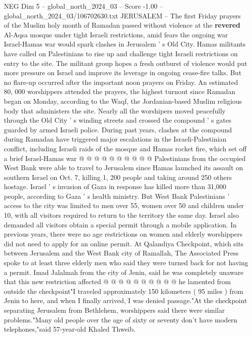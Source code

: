 \begin{textsample}{NEG Dim 5 – global\_north\_2024\_03 – Score -1.00 – global\_north\_2024\_03/106702630.txt}  \label{ex:f5_neg_166}
JERUSALEM -- The first Friday prayers of the Muslim holy month of Ramadan passed without violence at the \textbf{revered} Al-Aqsa mosque under tight Israeli restrictions, amid fears the ongoing war Israel-Hamas war would spark clashes in Jerusalem ' s Old City.
Hamas militants have called on Palestinians to rise up and challenge tight Israeli restrictions on entry to the site.
The militant group hopes a fresh outburst of violence would put more pressure on Israel and improve its leverage in ongoing cease-fire talks.
But no flare-up occurred after the important noon prayers on Friday.
An estimated 80, 000 worshippers attended the prayers, the highest turnout since Ramadan began on Monday, according to the Waqf, the Jordanian-based Muslim religious body that administers the site.
Nearly all the worshipers moved peacefully through the Old City ' s winding streets and crossed the compound ' s gates guarded by armed Israeli police.
During past years, clashes at the compound during Ramadan have triggered major escalations in the Israeli-Palestinian conflict, including Israeli raids of the mosque and Hamas rocket fire, which set off a brief Israel-Hamas war @ @ @ @ @ @ @ @ @ @ Palestinians from the occupied West Bank were able to travel to Jerusalem since Hamas launched its assault on southern Israel on Oct. 7, killing 1, 200 people and taking around 250 others hostage.
Israel ' s invasion of Gaza in response has killed more than 31,000 people, according to Gaza ' s health ministry.
But West Bank Palestinians ' access to the city was limited to men over 55, women over 50 and children under 10, with all visitors required to return to the territory the same day.
Israel also demanded all visitors obtain a special permit through a mobile application.
In previous years, there were no age restrictions on women and elderly worshippers did not need to apply for an online permit.
At Qalandiya Checkpoint, which sits between Jerusalem and the West Bank city of Ramallah, The Associated Press spoke to at least three elderly men who said they were turned back for not having a permit.
Imad Jalalmah from the city of Jenin, said he was completely unaware that this new restriction affected @ @ @ @ @ @ @ @ @ @ he lamented from outside the checkpoint"I traveled approximately 150 kilometers ( 95 miles ) from Jenin to here, and when I finally arrived, I was denied passage."At the checkpoint separating Jerusalem from Bethlehem, worshippers said there were similar problems."Many old people over the age of sixty or seventy don't have modern telephones,"said 57-year-old Khaled Thweib.

\end{textsample}
